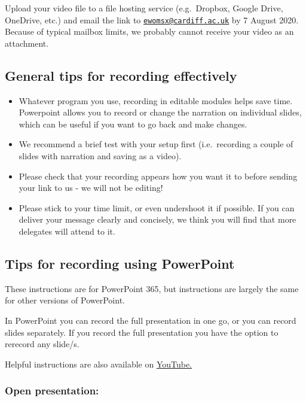 \documentclass[
  12pt,
]{book}
\begin{document}
Upload your video file to a file hosting service (e.g.~Dropbox, Google Drive, OneDrive, etc.) and email the link to \href{mailto:ewomsx@cardiff.ac.uk}{\nolinkurl{ewomsx@cardiff.ac.uk}} by 7 August 2020. Because of typical mailbox limits, we probably cannot receive your video as an attachment.

\hypertarget{general-tips-for-recording-effectively}{%
\subsection{General tips for recording effectively}\label{general-tips-for-recording-effectively}}

\begin{itemize}
\item
  Whatever program you use, recording in editable modules helps save time. Powerpoint allows you to record or change the narration on individual slides, which can be useful if you want to go back and make changes.
\item
  We recommend a brief test with your setup first (i.e.~recording a couple of slides with narration and saving as a video).
\item
  Please check that your recording appears how you want it to before sending your link to us - we will not be editing!
\item
  Please stick to your time limit, or even undershoot it if possible. If you can deliver your message clearly and concisely, we think you will find that more delegates will attend to it.
\end{itemize}

\hypertarget{tips-for-recording-using-powerpoint}{%
\subsection{Tips for recording using PowerPoint}\label{tips-for-recording-using-powerpoint}}

These instructions are for PowerPoint 365, but instructions are largely the same for other versions of PowerPoint.

In PowerPoint you can record the full presentation in one go, or you can record slides separately. If you record the full presentation you have the option to rerecord any slide/s.

Helpful instructions are also available on \href{https://www.youtube.com/watch?v=f8u_QDZLqMs}{YouTube.}

\hypertarget{open-presentation}{%
\subsubsection{Open presentation:}\label{open-presentation}}
\end{document}
